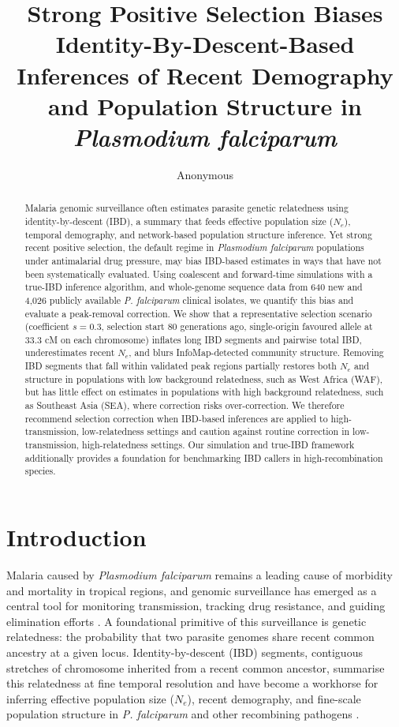 \documentclass[11pt]{article}
\title{Strong Positive Selection Biases Identity-By-Descent-Based Inferences of Recent Demography and Population Structure in \textit{Plasmodium falciparum}}
\author{Anonymous}
\date{}
\begin{document}
\maketitle

\begin{abstract}
Malaria genomic surveillance often estimates parasite genetic relatedness using identity-by-descent (IBD), a summary that feeds effective population size ($N_e$), temporal demography, and network-based population structure inference. Yet strong recent positive selection, the default regime in \textit{Plasmodium falciparum} populations under antimalarial drug pressure, may bias IBD-based estimates in ways that have not been systematically evaluated. Using coalescent and forward-time simulations with a true-IBD inference algorithm, and whole-genome sequence data from 640 new and 4,026 publicly available \textit{P. falciparum} clinical isolates, we quantify this bias and evaluate a peak-removal correction. We show that a representative selection scenario (coefficient $s = 0.3$, selection start $80$ generations ago, single-origin favoured allele at $33.3$ cM on each chromosome) inflates long IBD segments and pairwise total IBD, underestimates recent $N_e$, and blurs InfoMap-detected community structure. Removing IBD segments that fall within validated peak regions partially restores both $N_e$ and structure in populations with low background relatedness, such as West Africa (WAF), but has little effect on estimates in populations with high background relatedness, such as Southeast Asia (SEA), where correction risks over-correction. We therefore recommend selection correction when IBD-based inferences are applied to high-transmission, low-relatedness settings and caution against routine correction in low-transmission, high-relatedness settings. Our simulation and true-IBD framework additionally provides a foundation for benchmarking IBD callers in high-recombination species.
\end{abstract}

\section{Introduction}

Malaria caused by \textit{Plasmodium falciparum} remains a leading cause of morbidity and mortality in tropical regions, and genomic surveillance has emerged as a central tool for monitoring transmission, tracking drug resistance, and guiding elimination efforts \citep{who2022worldmalaria,malariagen2021pf6}. A foundational primitive of this surveillance is genetic relatedness: the probability that two parasite genomes share recent common ancestry at a given locus. Identity-by-descent (IBD) segments, contiguous stretches of chromosome inherited from a recent common ancestor, summarise this relatedness at fine temporal resolution and have become a workhorse for inferring effective population size ($N_e$), recent demography, and fine-scale population structure in \textit{P. falciparum} and other recombining pathogens \citep{schaffner2018hmmibd,henden2018isorelate,taylor2019ibd}.
\end{document}
